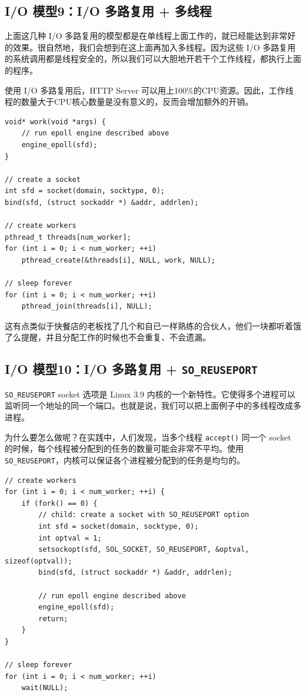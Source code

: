 \documentclass[a4paper]{article}
\begin{document}
\subsection{I/O 模型9：I/O 多路复用 + 多线程}

上面这几种 I/O 多路复用的模型都是在单线程上面工作的，就已经能达到非常好的效果。很自然地，我们会想到在这上面再加入多线程。因为这些 I/O 多路复用的系统调用都是线程安全的，所以我们可以大胆地开若干个工作线程，都执行上面的程序。

使用 I/O 多路复用后，HTTP Server 可以用上100\%的CPU资源。因此，工作线程的数量大于CPU核心数量是没有意义的，反而会增加额外的开销。

\begin{verbatim}
void* work(void *args) {
    // run epoll engine described above
    engine_epoll(sfd);
}

// create a socket
int sfd = socket(domain, socktype, 0);
bind(sfd, (struct sockaddr *) &addr, addrlen);

// create workers
pthread_t threads[num_worker];
for (int i = 0; i < num_worker; ++i)
    pthread_create(&threads[i], NULL, work, NULL);

// sleep forever
for (int i = 0; i < num_worker; ++i)
    pthread_join(threads[i], NULL);
\end{verbatim}

这有点类似于快餐店的老板找了几个和自已一样熟练的合伙人，他们一块都听着饿了么提醒，并且分配工作的时候也不会重复、不会遗漏。

\subsection{I/O 模型10：I/O 多路复用 + \texttt{SO\_REUSEPORT}}

\texttt{SO\_REUSEPORT} socket 选项是 Linux 3.9 内核的一个新特性。它使得多个进程可以监听同一个地址的同一个端口。也就是说，我们可以把上面例子中的多线程改成多进程。

为什么要怎么做呢？在实践中，人们发现，当多个线程 \texttt{accept()} 同一个 socket 的时候，每个线程被分配到的任务的数量可能会非常不平均。使用 \texttt{SO\_REUSEPORT}，内核可以保证各个进程被分配到的任务是均匀的。

\begin{verbatim}
// create workers
for (int i = 0; i < num_worker; ++i) {
    if (fork() == 0) {
        // child: create a socket with SO_REUSEPORT option
        int sfd = socket(domain, socktype, 0);
        int optval = 1;
        setsockopt(sfd, SOL_SOCKET, SO_REUSEPORT, &optval, sizeof(optval));
        bind(sfd, (struct sockaddr *) &addr, addrlen);

        // run epoll engine described above
        engine_epoll(sfd);
        return;
    }
}

// sleep forever
for (int i = 0; i < num_worker; ++i)
    wait(NULL);
\end{verbatim}
\end{document}
